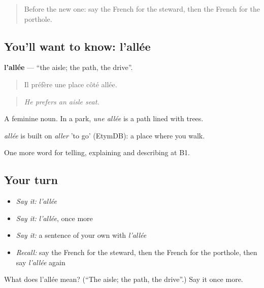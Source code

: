 \label{lesson:FR-C418-allee}



\begin{quote}
Before the new one: say the French for the steward, then the French for the porthole.
\end{quote}

\subsection*{You'll want to know: l'allée}
\textbf{l'allée} — \textquotedblleft{}the aisle; the path, the drive\textquotedblright{}.

\begin{quote}
Il préfère une place côté allée.
\end{quote}

\begin{quote}
\emph{He prefers an aisle seat.}
\end{quote}

A feminine noun. In a park, \emph{une allée} is a path lined with trees.

\begin{cousinweb}
\emph{allée} is built on \emph{aller} 'to go' (EtymDB): a place where you walk.
\end{cousinweb}

\begin{grammarlens}[title={What you've built}]
One more word for telling, explaining and describing at B1.
\end{grammarlens}

\subsection*{Your turn}
\begin{itemize}
\raggedright
  \item \emph{Say it:} \emph{l'allée}
  \item \emph{Say it:} \emph{l'allée}, once more
  \item \emph{Say it:} a sentence of your own with \emph{l'allée}
  \item \emph{Recall:} say the French for the steward, then the French for the porthole, then say \emph{l'allée} again
\end{itemize}

\begin{tcolorbox}[breakable,colback=teal!4,colframe=teal!35!black,title={Before you move on}]
What does l'allée mean? (\textquotedblleft{}The aisle; the path, the drive\textquotedblright{}.) Say it once more.
\end{tcolorbox}
